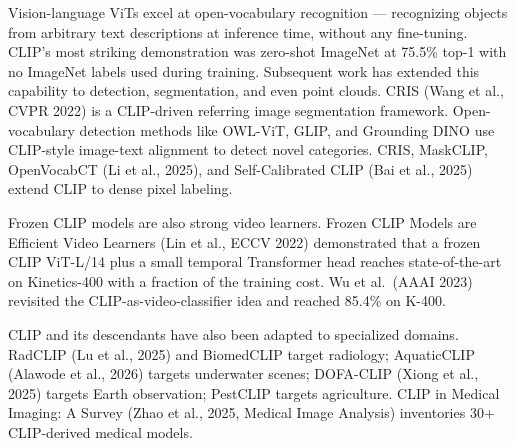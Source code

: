 Vision-language ViTs excel at open-vocabulary recognition --- recognizing objects from arbitrary text descriptions at inference time, without any fine-tuning. CLIP's most striking demonstration was zero-shot ImageNet at 75.5\% top-1 with no ImageNet labels used during training. Subsequent work has extended this capability to detection, segmentation, and even point clouds. CRIS (Wang et al., CVPR 2022) is a CLIP-driven referring image segmentation framework. Open-vocabulary detection methods like OWL-ViT, GLIP, and Grounding DINO use CLIP-style image-text alignment to detect novel categories. CRIS, MaskCLIP, OpenVocabCT (Li et al., 2025), and Self-Calibrated CLIP (Bai et al., 2025) extend CLIP to dense pixel labeling.

Frozen CLIP models are also strong video learners. Frozen CLIP Models are Efficient Video Learners (Lin et al., ECCV 2022) demonstrated that a frozen CLIP ViT-L/14 plus a small temporal Transformer head reaches state-of-the-art on Kinetics-400 with a fraction of the training cost. Wu et al.~(AAAI 2023) revisited the CLIP-as-video-classifier idea and reached 85.4\% on K-400.

CLIP and its descendants have also been adapted to specialized domains. RadCLIP (Lu et al., 2025) and BiomedCLIP target radiology; AquaticCLIP (Alawode et al., 2026) targets underwater scenes; DOFA-CLIP (Xiong et al., 2025) targets Earth observation; PestCLIP targets agriculture. CLIP in Medical Imaging: A Survey (Zhao et al., 2025, Medical Image Analysis) inventories 30+ CLIP-derived medical models.


